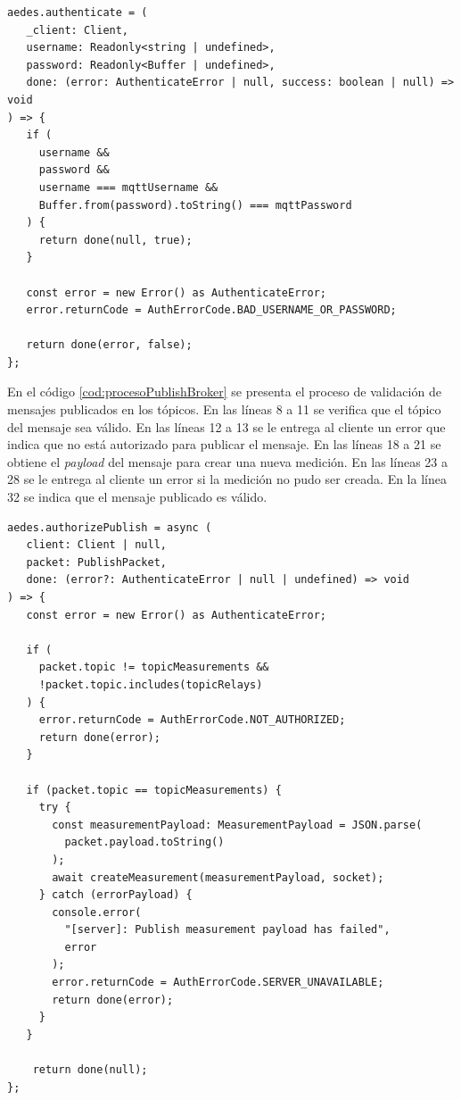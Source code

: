 \newpage
\begin{lstlisting}[label=cod:autenticaciónBroker,caption=Autenticación de clientes.]
aedes.authenticate = (
   _client: Client,
   username: Readonly<string | undefined>,
   password: Readonly<Buffer | undefined>,
   done: (error: AuthenticateError | null, success: boolean | null) => void
) => {
   if (
     username &&
     password &&
     username === mqttUsername &&
     Buffer.from(password).toString() === mqttPassword
   ) {
     return done(null, true);
   }

   const error = new Error() as AuthenticateError;
   error.returnCode = AuthErrorCode.BAD_USERNAME_OR_PASSWORD;

   return done(error, false);
};
\end{lstlisting}

En el código \ref{cod:procesoPublishBroker} se presenta el proceso de validación de mensajes publicados en los tópicos. En las líneas 8 a 11 se verifica que el tópico del mensaje sea válido. En las líneas 12 a 13 se le entrega al cliente un error que indica que no está autorizado para publicar el mensaje. En las líneas 18 a 21 se obtiene el \emph{payload} del mensaje para crear una nueva medición. En las líneas 23 a 28 se le entrega al cliente un error si la medición no pudo ser creada. En la línea 32 se indica que el mensaje publicado es válido.

\newpage
\begin{lstlisting}[label=cod:procesoPublishBroker,caption=Validación de mensajes.]
aedes.authorizePublish = async (
   client: Client | null,
   packet: PublishPacket,
   done: (error?: AuthenticateError | null | undefined) => void
) => {
   const error = new Error() as AuthenticateError;

   if (
     packet.topic != topicMeasurements &&
     !packet.topic.includes(topicRelays)
   ) {
     error.returnCode = AuthErrorCode.NOT_AUTHORIZED;
     return done(error);
   }

   if (packet.topic == topicMeasurements) {
     try {
       const measurementPayload: MeasurementPayload = JSON.parse(
         packet.payload.toString()
       );
       await createMeasurement(measurementPayload, socket);
     } catch (errorPayload) {
       console.error(
         "[server]: Publish measurement payload has failed",
         error
       );
       error.returnCode = AuthErrorCode.SERVER_UNAVAILABLE;
       return done(error);
     }
   }

    return done(null);
};
\end{lstlisting}

